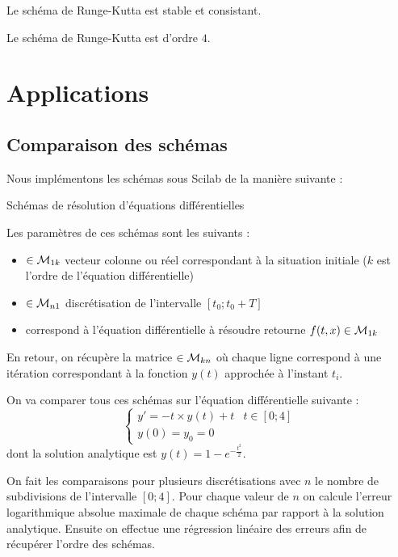 		\begin{propShort}
			Le schéma de Runge-Kutta est stable et consistant.
		\end{propShort}

		\begin{propShort}
			Le schéma de Runge-Kutta est d'ordre $4$.
		\end{propShort}

\section{Applications}
	\subsection{Comparaison des schémas}
		
		Nous implémentons les schémas sous Scilab de la manière suivante :

		\begin{listing}[H]
			\caption{Schémas de résolution d'équations différentielles}
			\label{code-3-schemasED}
		\end{listing}

		Les paramètres de ces schémas sont les suivants :
		\begin{itemize}
			\item {} $\in\mathcal{M}_{1k}$ vecteur colonne ou réel correspondant à la situation initiale ($k$ est l'ordre de l'équation différentielle)
			\item {} $\in\mathcal{M}_{n1}$ discrétisation de l'intervalle $[t_0; t_0+T]$
			\item {} correspond à l'équation différentielle à résoudre retourne $f(t,x) \in\mathcal{M}_{1k}$
		\end{itemize}
		En retour, on récupère la matrice  $\in\mathcal{M}_{kn}$ où chaque ligne correspond à une itération correspondant à la fonction $y(t)$ approchée à l'instant $t_i$.

		On va comparer tous ces schémas sur l'équation différentielle suivante :
		\begin{equation}
			\begin{cases}
				y' = -t\times y(t) + t	& t\in[0;4]	\\
				y(0) = y_0 = 0
			\end{cases}
		\end{equation}
		dont la solution analytique est $y(t) = 1 - e^{-\frac{t^2}{2}}$.

		On fait les comparaisons pour plusieurs discrétisations avec $n$ le nombre de subdivisions de l'intervalle $[0;4]$. Pour chaque valeur de $n$ on calcule l'erreur logarithmique absolue maximale de chaque schéma par rapport à la solution analytique.
		Ensuite on effectue une régression linéaire des erreurs afin de récupérer l'ordre des schémas.

